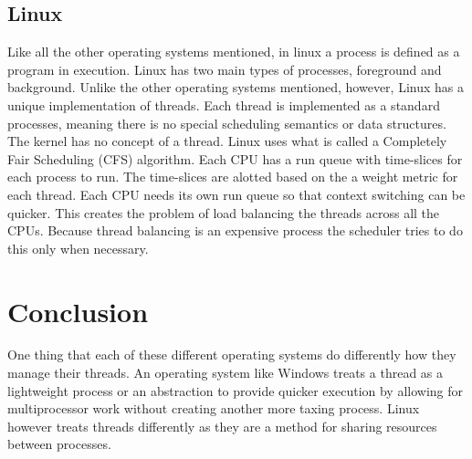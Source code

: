 \documentclass[a4paper,10pt,onecolumn]{article}
\begin{document}
\subsection{Linux}
Like all the other operating systems mentioned, in linux a process is defined as a program in execution. Linux has two main types of processes, foreground and background.\newline
Unlike the other operating systems mentioned, however, Linux has a unique implementation of threads. Each thread is implemented as a standard processes, meaning there is no special scheduling semantics or data structures. The kernel has no concept of a thread.
\newline
\newline
Linux uses what is called a {C}ompletely {F}air {S}cheduling {(CFS)} algorithm. Each CPU has a run queue with time-slices for each process to run. The time-slices are alotted based on the a weight metric for each thread. Each CPU needs its own run queue so that context switching can be quicker. This creates the problem of load balancing the threads across all the CPUs. Because thread balancing is an expensive process the scheduler tries to do this only when necessary. \cite{themorningpaper}

\section{Conclusion}
One thing that each of these different operating systems do differently how they manage their threads. An operating system like Windows treats a thread as a lightweight process or an abstraction to provide quicker execution by allowing for multiprocessor work without creating another more taxing process. Linux however treats threads differently as they are a method for sharing resources between processes.\cite{love_2005} 




\end{document}
